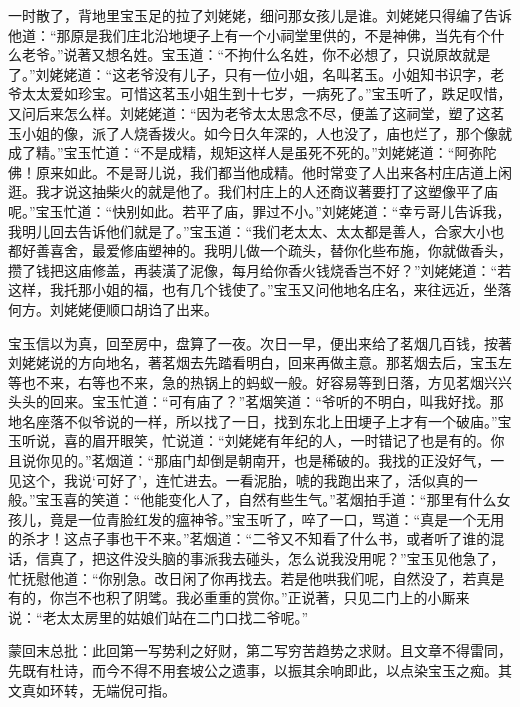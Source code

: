 \begin{parag}


    一时散了，背地里宝玉足的拉了刘姥姥，细问那女孩儿是谁。刘姥姥只得编了告诉他道：“那原是我们庄北沿地埂子上有一个小祠堂里供的，不是神佛，当先有个什么老爷。”说著又想名姓。宝玉道：“不拘什么名姓，你不必想了，只说原故就是了。”刘姥姥道：“这老爷没有儿子，只有一位小姐，名叫茗玉。小姐知书识字，老爷太太爱如珍宝。可惜这茗玉小姐生到十七岁，一病死了。”宝玉听了，跌足叹惜，又问后来怎么样。刘姥姥道：“因为老爷太太思念不尽，便盖了这祠堂，塑了这茗玉小姐的像，派了人烧香拨火。如今日久年深的，人也没了，庙也烂了，那个像就成了精。”宝玉忙道：“不是成精，规矩这样人是虽死不死的。”刘姥姥道：“阿弥陀佛！原来如此。不是哥儿说，我们都当他成精。他时常变了人出来各村庄店道上闲逛。我才说这抽柴火的就是他了。我们村庄上的人还商议著要打了这塑像平了庙呢。”宝玉忙道：“快别如此。若平了庙，罪过不小。”刘姥姥道：“幸亏哥儿告诉我，我明儿回去告诉他们就是了。”宝玉道：“我们老太太、太太都是善人，合家大小也都好善喜舍，最爱修庙塑神的。我明儿做一个疏头，替你化些布施，你就做香头，攒了钱把这庙修盖，再装潢了泥像，每月给你香火钱烧香岂不好？”刘姥姥道：“若这样，我托那小姐的福，也有几个钱使了。”宝玉又问他地名庄名，来往远近，坐落何方。刘姥姥便顺口胡诌了出来。
\end{parag}


\begin{parag}


    宝玉信以为真，回至房中，盘算了一夜。次日一早，便出来给了茗烟几百钱，按著刘姥姥说的方向地名，著茗烟去先踏看明白，回来再做主意。那茗烟去后，宝玉左等也不来，右等也不来，急的热锅上的蚂蚁一般。好容易等到日落，方见茗烟兴兴头头的回来。宝玉忙道：“可有庙了？”茗烟笑道：“爷听的不明白，叫我好找。那地名座落不似爷说的一样，所以找了一日，找到东北上田埂子上才有一个破庙。”宝玉听说，喜的眉开眼笑，忙说道：“刘姥姥有年纪的人，一时错记了也是有的。你且说你见的。”茗烟道：“那庙门却倒是朝南开，也是稀破的。我找的正没好气，一见这个，我说‘可好了’，连忙进去。一看泥胎，唬的我跑出来了，活似真的一般。”宝玉喜的笑道：“他能变化人了，自然有些生气。”茗烟拍手道：“那里有什么女孩儿，竟是一位青脸红发的瘟神爷。”宝玉听了，啐了一口，骂道：“真是一个无用的杀才！这点子事也干不来。”茗烟道：“二爷又不知看了什么书，或者听了谁的混话，信真了，把这件没头脑的事派我去碰头，怎么说我没用呢？”宝玉见他急了，忙抚慰他道：“你别急。改日闲了你再找去。若是他哄我们呢，自然没了，若真是有的，你岂不也积了阴骘。我必重重的赏你。”正说著，只见二门上的小厮来说：“老太太房里的姑娘们站在二门口找二爷呢。”
\end{parag}

\begin{parag}

    \begin{note}蒙回末总批：此回第一写势利之好财，第二写穷苦趋势之求财。且文章不得雷同，先既有杜诗，而今不得不用套坡公之遗事，以振其余响即此，以点染宝玉之痴。其文真如环转，无端倪可指。\end{note}
\end{parag}


